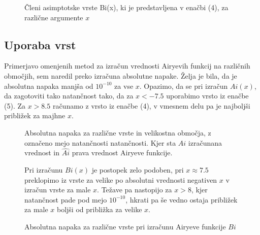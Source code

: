 \documentclass[11pt]{article}
\begin{document}
\begin{figure}[h!]	 %
\begin{center}


\end{center}
\caption{Členi asimptotske vrste Bi(x), ki je predstavljena v enačbi (4), za različne argumente $x$}
\end{figure}


\subsection{Uporaba vrst}

Primerjavo omenjenih metod za izračun vrednosti Airyevih funkcij na različnih območjih, sem naredil preko izračuna absolutne napake. Želja je bila, da je absolutna napaka manjša od $10^{-10}$  za vse $x$. Opazimo, da se pri izračun $Ai(x)$, da zagotoviti tako natančnost tako, da za $x < -7.5$ uporabimo vrsto iz enačbe (5). Za $x> 8.5$ računamo z vrsto iz enačbe (4), v vmesnem delu pa je najboljši približek za majhne $x$. 
\begin{figure}[h!]	 %
\begin{center}


\end{center}
\caption{Absolutna napaka za različne vrste in velikostna območja, z označeno mejo natančnosti natančnosti. Kjer sta $Ai$ izračunana vrednost in $\widehat{Ai}$ prava vrednost Airyeve funkcije.}
\end{figure}

\begin{figure}[h!]	 %
\begin{center}

Pri izračunu $Bi(x)$ je postopek zelo podoben, pri $ x \approx 7.5$  preklopimo iz vrste za velike po absolutni vrednosti negativen $x$   v izračun vrste za male $x$. Težave pa nastopijo za $x >8$, kjer natančnost pade pod mejo $ 10^{-10}$,  hkrati pa še vedno ostaja približek za male $x$ boljši od približka za velike $x$. 

\end{center}
\caption{Absolutna napaka za različne vrste pri izračunu Airyeve funkcije $Bi$}
\end{figure}
\end{document}
